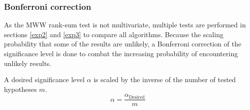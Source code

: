 \subsubsection{Bonferroni correction}
As the MWW rank-sum test is not multivariate, multiple tests are performed in sections \ref{exp2} and \ref{exp3} to compare all algorithms. Because the scaling probability that some of the results are unlikely, a Bonferroni correction of the significance level is done to combat the increasing probability of encountering unlikely results. 

A desired significance level \(\alpha\) is scaled by the inverse of the number of tested hypotheses \(m\). 
\begin{equation*}
    \alpha=\frac{\alpha_{\text{Desired}}}{m}
\end{equation*}


